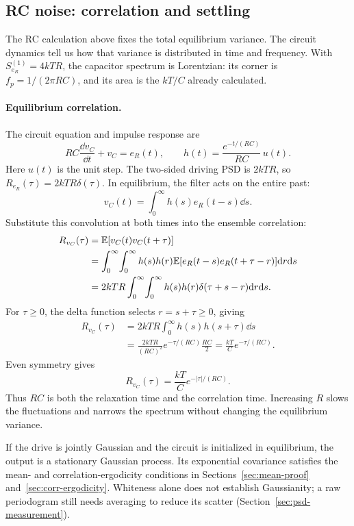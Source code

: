 \subsection{RC noise: correlation and settling}
\label{sec:rc-chain}
The RC calculation above fixes the total equilibrium variance. The circuit dynamics tell us how that variance is distributed in time and frequency. With $S_{e_R}^{(1)}=4kTR$, the capacitor spectrum is Lorentzian: its corner is $f_p=1/(2\pi RC)$, and its area is the $kT/C$ already calculated.

\paragraph{Equilibrium correlation.}
The circuit equation and impulse response are
\[
RC\frac{\dd v_C}{\dd t}+v_C=e_R(t),\qquad
h(t)=\frac{e^{-t/(RC)}}{RC}\,u(t).
\]
Here $u(t)$ is the unit step. The two-sided driving PSD is $2kTR$, so $R_{e_R}(\tau)=2kTR\delta(\tau)$. In equilibrium, the filter acts on the entire past:
\[
v_C(t)=\int_0^\infty h(s)e_R(t-s)\dd s.
\]
Substitute this convolution at both times into the ensemble correlation:
\begin{align*}
R_{v_C}(\tau)
&=\mathbb E[v_C(t)v_C(t+\tau)]\\
&=\int_0^\infty\!\int_0^\infty h(s)h(r)
\mathbb E[e_R(t-s)e_R(t+\tau-r)]\mathrm d r\mathrm d s\\
&=2kTR\int_0^\infty\!\int_0^\infty h(s)h(r)
\delta(\tau+s-r)\mathrm d r\mathrm d s.
\end{align*}
For $\tau\geq0$, the delta function selects $r=s+\tau\geq0$, giving
\begin{align*}
R_{v_C}(\tau)
&=2kTR\int_0^\infty h(s)h(s+\tau)\dd s\\
&=\frac{2kTR}{(RC)^2}e^{-\tau/(RC)}\frac{RC}{2}
=\frac{kT}{C}e^{-\tau/(RC)}.
\end{align*}
Even symmetry gives
\begin{equation}
\boxed{R_{v_C}(\tau)=\frac{kT}{C}e^{-|\tau|/(RC)}.}
\end{equation}
Thus $RC$ is both the relaxation time and the correlation time. Increasing $R$ slows the fluctuations and narrows the spectrum without changing the equilibrium variance.

If the drive is jointly Gaussian and the circuit is initialized in equilibrium, the output is a stationary Gaussian process. Its exponential covariance satisfies the mean- and correlation-ergodicity conditions in Sections~\ref{sec:mean-proof} and~\ref{sec:corr-ergodicity}. Whiteness alone does not establish Gaussianity; a raw periodogram still needs averaging to reduce its scatter (Section~\ref{sec:psd-measurement}).

